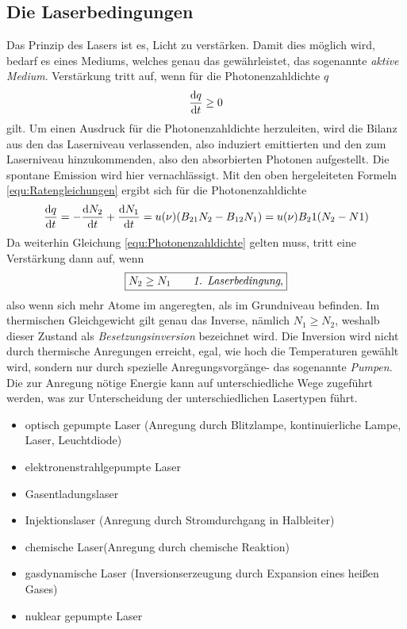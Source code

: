 \documentclass[a4paper,twoside,final]{article}
\begin{document}
\subsection{Die Laserbedingungen}
Das Prinzip des Lasers ist es, Licht zu verstärken. Damit dies möglich wird, bedarf es eines Mediums, welches genau das gewährleistet, das sogenannte \textit{aktive Medium}. Verstärkung tritt auf, wenn für die Photonenzahldichte $q$
\begin{align}
  \dv{q}{t} \geq 0
  \label{equ:Photonenzahldichte}
\end{align}
gilt. Um einen Ausdruck für die Photonenzahldichte herzuleiten, wird die Bilanz aus den das Laserniveau verlassenden, also induziert emittierten und den zum Laserniveau hinzukommenden, also den absorbierten Photonen aufgestellt. Die spontane Emission wird hier vernachlässigt. Mit den oben hergeleiteten Formeln \eqref{equ:Ratengleichungen} ergibt sich für die Photonenzahldichte
\begin{align}
    \dv{q}{t}=-\dv{N_2}{t}+\dv{N_1}{t}=u(\nu)(B_{21}N_2-B_{12}N_1)=u(\nu)B_21(N_2-N1)
\end{align}
Da weiterhin Gleichung \eqref{equ:Photonenzahldichte} gelten muss, tritt eine Verstärkung dann auf, wenn
\begin{align}
  \boxed{N_2 \geq N_1 \qquad \emph{1. Laserbedingung},}
\end{align}
also wenn sich mehr Atome im angeregten, als im Grundniveau befinden. Im thermischen Gleichgewicht gilt genau das Inverse, nämlich $N_1 \geq N_2$, weshalb dieser Zustand als \textit{Besetzungsinversion} bezeichnet wird. Die Inversion wird nicht durch thermische Anregungen erreicht, egal, wie hoch die Temperaturen gewählt wird, sondern nur durch spezielle Anregungsvorgänge- das sogenannte \textit{Pumpen}.\\
Die zur Anregung nötige Energie kann auf unterschiedliche Wege zugeführt werden, was zur Unterscheidung der unterschiedlichen Lasertypen führt.
\begin{itemize}
  \item optisch gepumpte Laser (Anregung durch Blitzlampe, kontinuierliche Lampe, Laser, Leuchtdiode)
  \item elektronenstrahlgepumpte Laser
  \item Gasentladungslaser
  \item Injektionslaser (Anregung durch Stromdurchgang in Halbleiter)
  \item chemische Laser(Anregung durch chemische Reaktion)
  \item gasdynamische Laser (Inversionserzeugung durch Expansion eines heißen Gases)
  \item nuklear gepumpte Laser
\end{itemize}
\end{document}
